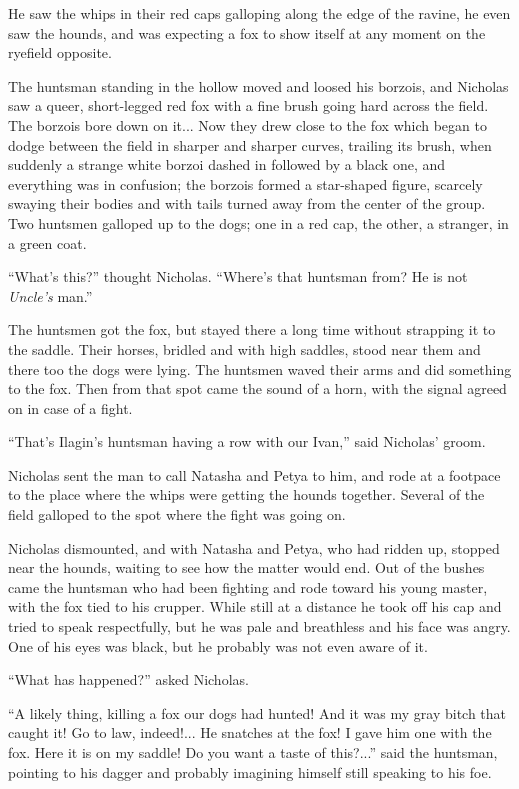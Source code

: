 He saw the whips in their red caps galloping along the edge of
the ravine, he even saw the hounds, and was expecting a fox to
show itself at any moment on the ryefield opposite.

The huntsman standing in the hollow moved and loosed his borzois,
and Nicholas saw a queer, short-legged red fox with a fine brush
going hard across the field. The borzois bore down on it... Now
they drew close to the fox which began to dodge between the field
in sharper and sharper curves, trailing its brush, when suddenly
a strange white borzoi dashed in followed by a black one, and
everything was in confusion; the borzois formed a star-shaped
figure, scarcely swaying their bodies and with tails turned away
from the center of the group. Two huntsmen galloped up to the
dogs; one in a red cap, the other, a stranger, in a green coat.

``What's this?'' thought Nicholas. ``Where's that huntsman from?
He is not \emph{Uncle's} man.''

The huntsmen got the fox, but stayed there a long time without
strapping it to the saddle. Their horses, bridled and with high
saddles, stood near them and there too the dogs were lying. The
huntsmen waved their arms and did something to the fox. Then from
that spot came the sound of a horn, with the signal agreed on in
case of a fight.

``That's Ilagin's huntsman having a row with our Ivan,'' said
Nicholas' groom.

Nicholas sent the man to call Natasha and Petya to him, and rode
at a footpace to the place where the whips were getting the
hounds together.  Several of the field galloped to the spot where
the fight was going on.

Nicholas dismounted, and with Natasha and Petya, who had ridden
up, stopped near the hounds, waiting to see how the matter would
end. Out of the bushes came the huntsman who had been fighting
and rode toward his young master, with the fox tied to his
crupper. While still at a distance he took off his cap and tried
to speak respectfully, but he was pale and breathless and his
face was angry. One of his eyes was black, but he probably was
not even aware of it.

``What has happened?'' asked Nicholas.

``A likely thing, killing a fox our dogs had hunted! And it was
my gray bitch that caught it! Go to law, indeed!... He snatches
at the fox! I gave him one with the fox. Here it is on my saddle!
Do you want a taste of this?...'' said the huntsman, pointing to
his dagger and probably imagining himself still speaking to his
foe.

